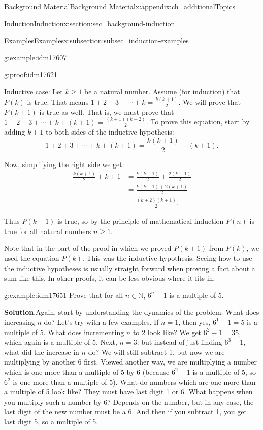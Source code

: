 \documentclass[oneside,10pt,]{book}
\numberwithin{equation}{chapter}
\def\N{\mathbb N}
\newcommand{\amp}{&}
\begin{document}
\begin{appendixptx}{Background Material}{}{Background Material}{}{}{x:appendix:ch_additionalTopics}
\begin{sectionptx}{Induction}{}{Induction}{}{}{x:section:sec_background-induction}
\begin{subsectionptx}{Examples}{}{Examples}{}{}{x:subsection:subsec_induction-examples}
\begin{example}{}{g:example:idm17607}
\begin{proofptx}{}{g:proof:idm17621}
\par
Inductive case: Let \(k \ge 1\) be a natural number. Assume (for induction) that \(P(k)\) is true. That means \(1 + 2 + 3 + \cdots + k = \frac{k(k+1)}{2}\). We will prove that \(P(k+1)\) is true as well. That is, we must prove that \(1 + 2 + 3 + \cdots + k + (k+1) = \frac{(k+1)(k+2)}{2}\). To prove this equation, start by adding \(k+1\) to both sides of the inductive hypothesis:%
\begin{equation*}
1 + 2 + 3 + \cdots + k + (k+1) = \frac{k(k+1)}{2} + (k+1).
\end{equation*}
%
\par
Now, simplifying the right side we get:%
\begin{align*}
\frac{k(k+1)}{2} + k+1 \amp = \frac{k(k+1)}{2} + \frac{2(k+1)}{2}\\
\amp = \frac{k(k+1) + 2(k+1)}{2}\\
\amp = \frac{(k+2)(k+1)}{2}.
\end{align*}
%
\par
Thus \(P(k+1)\) is true, so by the principle of mathematical induction \(P(n)\) is true for all natural numbers \(n \ge 1\).%
\end{proofptx}
\end{example}
Note that in the part of the proof in which we proved \(P(k+1)\) from \(P(k)\), we used the equation \(P(k)\). This was the inductive hypothesis. Seeing how to use the inductive hypotheses is usually straight forward when proving a fact about a sum like this. In other proofs, it can be less obvious where it fits in.%
\begin{example}{}{g:example:idm17651}%
Prove that for all \(n \in \N\), \(6^n - 1\) is a multiple of 5.%
\par\smallskip%
\noindent\textbf{Solution}.\hypertarget{g:solution:idm17656}{}\quad{}Again, start by understanding the dynamics of the problem. What does increasing \(n\) do? Let's try with a few examples. If \(n = 1\), then yes, \(6^1 - 1 = 5\) is a multiple of 5. What does incrementing \(n\) to 2 look like? We get \(6^2 - 1 = 35\), which again is a multiple of 5. Next, \(n = 3\): but instead of just finding \(6^3 - 1\), what did the increase in \(n\) do? We will still subtract 1, but now we are multiplying by another 6 first. Viewed another way, we are multiplying a number which is one more than a multiple of 5 by 6 (because \(6^2 - 1\) is a multiple of 5, so \(6^2\) is one more than a multiple of 5). What do numbers which are one more than a multiple of 5 look like? They must have last digit 1 or 6. What happens when you multiply such a number by 6? Depends on the number, but in any case, the last digit of the new number must be a 6. And then if you subtract 1, you get last digit 5, so a multiple of 5.%

\end{example}
\end{subsectionptx}
\end{sectionptx}
\end{appendixptx}
\end{document}
